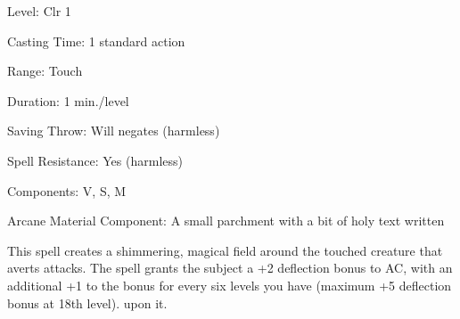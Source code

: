 
\begin{description*}
\item[Level:] Clr 1
\item[Casting Time:] 1 standard action
\item[Range:] Touch
\item[Duration:] 1 min./level
\item[Saving Throw:] Will negates (harmless)
\item[Spell Resistance:] Yes (harmless)
\item[Components:] V, S, M
\item[Arcane Material Component:] A small parchment with a bit of holy text written
\end{description*}

This spell creates a shimmering, magical field around the touched creature that
averts attacks. The spell grants the subject a +2 deflection bonus to AC, with
an additional +1 to the bonus for every six levels you have (maximum +5 deflection
bonus at 18th level).
upon it.